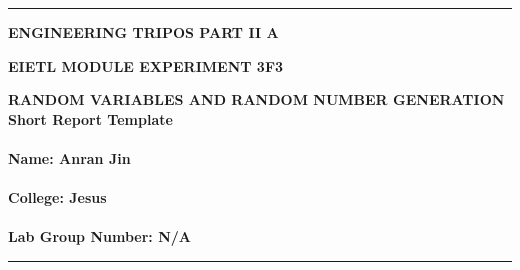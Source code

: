 \documentclass[12pt]{article}
\begin{document}
\noindent
\rule{15.7cm}{0.5mm}


\begin{center}
{\bf ENGINEERING TRIPOS PART II A}
\end{center}
\vspace{0.5cm} {\bf EIETL \hfill MODULE EXPERIMENT 3F3}
\vspace{0.5cm}
\begin{center}
{\bf RANDOM VARIABLES AND RANDOM NUMBER GENERATION\\
Short  Report Template\\\hfill \\Name: Anran Jin \\\hfill\\
College: Jesus  \\\hfill
\\
Lab Group Number: N/A
}
\end{center}
\rule{15.7cm}{0.5mm}



\vspace*{1cm}
\begin{center}
\end{center}
\vspace*{1cm}
\end{document}
